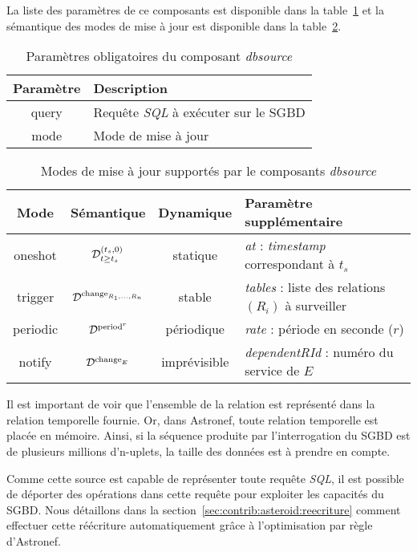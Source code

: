 La liste des paramètres de ce composants est disponible dans la table~\ref{tab:contrib:asteroid:dbsource} et la sémantique des modes de mise à jour est disponible dans la table~\ref{tab:contrib:asteroid:dbsource:modes}.
\begin{table}[ht]
    \centering
    \begin{tabular}{cl}
        Paramètre & Description \\ \midrule
        query & Requête \textit{SQL} à exécuter sur le SGBD \\
        mode & Mode de mise à jour
    \end{tabular}
    \caption{Paramètres obligatoires du composant \textit{dbsource}}\label{tab:contrib:asteroid:dbsource}
\end{table}
\begin{table}[ht]
    \centering
    \begin{tabular}{cccl}
        Mode & Sémantique & Dynamique & Paramètre supplémentaire \\ \midrule
        oneshot & $\mathcal{D}^{(t_s,0)}_{t\geq t_s}$ & statique & \textit{at} : \textit{timestamp} correspondant à $t_s$\\
        trigger & $\mathcal{D}^{\mathrm{change}_{R_1,...,R_n}}$ & stable & \textit{tables} : liste des relations $(R_i)$ à surveiller \\
        periodic & $\mathcal{D}^{\mathrm{period}^{r}}$ & périodique & \textit{rate} : période en seconde ($r$)\\
        notify & $\mathcal{D}^{\mathrm{change}_{E}}$ & imprévisible & \textit{dependentRId} : numéro du service de $E$
    \end{tabular}
    \caption{Modes de mise à jour supportés par le composants \textit{dbsource}}\label{tab:contrib:asteroid:dbsource:modes}
\end{table}

Il est important de voir que l'ensemble de la relation est représenté dans la relation temporelle fournie. Or, dans Astronef, toute relation temporelle est placée en mémoire. Ainsi, si la séquence produite par l'interrogation du SGBD est de plusieurs millions d'n-uplets, la taille des données est à prendre en compte. 

Comme cette source est capable de représenter toute requête \textit{SQL}, il est possible de déporter des opérations dans cette requête pour exploiter les capacités du SGBD. Nous détaillons dans la section~\ref{sec:contrib:asteroid:reecriture} comment effectuer cette réécriture automatiquement grâce à l'optimisation par règle d'Astronef.

